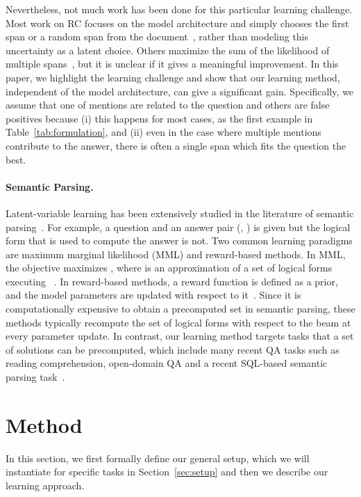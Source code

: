 \documentclass[11pt,a4paper]{article}
\begin{document}
Nevertheless, not much work has been done for this particular learning challenge. Most work on RC focuses on the model architecture and simply chooses the first span or a random span from the document~\citep{triviaqa,tay2018densely,multiqa}, rather than modeling this uncertainty as a latent choice.
Others maximize the sum of the likelihood of multiple spans~\citep{kadlec2016text,neural-cascades,clark2018multi,lee2019latent}, but it is unclear if it gives a meaningful improvement.
In this paper, we highlight the learning challenge and show that our learning method, independent of the model architecture, can give a significant gain. Specifically, we assume that one of mentions are related to the question and others are false positives because (i) this happens for most cases, as the first example in Table~\ref{tab:formulation}, and (ii) even in the case where multiple mentions contribute to the answer, there is often a single span which fits the question the best.

\paragraph{Semantic Parsing.} Latent-variable learning has been extensively studied in the literature of semantic parsing~\citep{Zettlemoyer2005LearningTM,clarke2010driving,liang2013learning,berant2013semantic,artzi2013weakly}.
For example, a question and an answer pair (, ) is given but the logical form that is used to compute the answer is not.
Two common learning paradigms are maximum marginal likelihood (MML) and reward-based methods. In MML, the objective maximizes , where  is an approximation of a set of logical forms executing ~\citep{liang2013learning,berant2013semantic,krishnamurthy2017neural}.
In reward-based methods, a reward function is defined as a prior, and the model parameters are updated with respect to it~\citep{sequentialwikitable,imlfirst,mapo}.
Since it is computationally expensive to obtain a precomputed set in semantic parsing, these methods typically recompute the set of logical forms with respect to the beam at every parameter update.
In contrast, our learning method targets tasks that a set of solutions can be precomputed, which include many recent QA tasks such as reading comprehension, open-domain QA and a recent SQL-based semantic parsing task~\cite{wikisql}.
 \section{Method}\label{sec:method}In this section, we first formally define our general setup, which we will instantiate for specific tasks in Section~\ref{sec:setup} and then we describe our learning approach.
\end{document}
